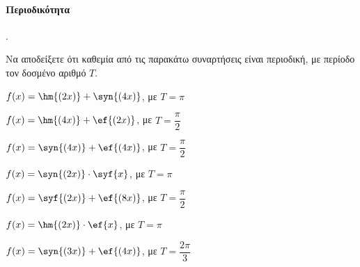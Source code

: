 \documentclass[11pt,a4paper,twocolumn]{article}
\newcounter{askhsh}
\newcommand{\askhsh}{\large\theaskhsh.\ \addtocounter{askhsh}{1}}
\begin{document}
\paragraph{Περιοδικότητα}
\askhsh Να αποδείξετε ότι καθεμία από τις παρακάτω συναρτήσεις είναι περιοδική, με περίοδο τον δοσμένο αριθμό $T$.
\begin{alist}
\item $f(x)=\hm{(2x)}+\syn{(4x)}$, με $T=\pi$
\item $f(x)=\hm{(4x)}+\ef{(2x)}$, με $T=\dfrac{\pi}{2}$
\item $f(x)=\syn{(4x)}+\ef{(4x)}$, με $T=\dfrac{\pi}{2}$
\item $f(x)=\syn{(2x)}\cdot\syf{x}$, με $T=\pi$
\item $f(x)=\syf{(2x)}+\ef{(8x)}$, με $T=\dfrac{\pi}{2}$
\item $f(x)=\hm{(2x)}\cdot\ef{x}$, με $T=\pi$
\item $f(x)=\syn{(3x)}+\ef{(4x)}$, με $T=\dfrac{2\pi}{3}$
\end{alist}
\end{document}
